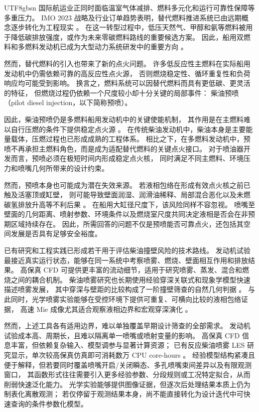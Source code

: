 \documentclass[english, 12pt, a4paper, elec, utf8, a-2b, online]{aaltothesis}
\begin{document}
\begin{CJK*}{UTF8}{gbsn}
国际航运业正同时面临温室气体减排、燃料多元化和运行可靠性保障等多重压力。
IMO 2023 战略及行业订单趋势表明，替代燃料推进系统已由远期概念逐步转化为工程现实
\cite{imo2023ghgstrategy,classnk2025alternativefuels}。
在这一转型过程中，低压天然气、甲醇和氨等燃料被用于降低碳排放强度，或作为未来零碳燃料路线的重要候选方案。
因此，船用双燃料和多燃料发动机已成为大型动力系统研发中的重要方向
\cite{wingd_lng_faq_2025,wingd_ammonia_faq_2025,classnk_methanol_2024}。

然而，替代燃料的引入也带来了新的点火问题。
许多低反应性主燃料在实际船用发动机中仍需依赖可靠的高反应性点火源，
否则燃烧稳定性、循环重复性和负荷响应均可能受到影响。
换言之，燃料系统可以因替代燃料而具有更低碳、更灵活的特征，
但燃烧过程仍依赖一个尺度较小却十分关键的局部事件：
柴油预喷（pilot diesel injection，以下简称预喷）。

因此，柴油预喷仍是多燃料船用发动机中的关键使能机制，
其作用是在主燃料难以自行压燃的条件下提供稳定点火源
\cite{wingd_xdf_manual_2021,classnk_methanol_2024}。
在传统柴油发动机中，柴油本身是主要能量载体，压燃过程也已形成成熟的工程体系。
相比之下，在多燃料发动机中，预喷不再承担主燃料角色，而是成为适配替代燃料的关键点火接口。
对于喷油器开发而言，预喷必须在极短时间内形成稳定点火核，
同时满足不同主燃料、环境压力和喷嘴几何所带来的设计约束。

然而，预喷本身也可能成为潜在失效来源。
若液相包络在形成有效点火核之前已触及活塞顶或缸壁，
则可能导致壁面润湿、润滑油稀释、局部混合恶化以及未燃碳氢排放升高等不利后果
\cite{peraza2022swi,ahmad2025fueldilution,MorieiraMotaPanao2010}。
在船用大缸径尺度下，该风险同样不容忽视。
喷嘴至壁面的几何距离、喷射参数、环境条件以及燃烧室尺度共同决定液相是否会在非预期区域持续存在。
因此，所需回答的问题不仅是预喷能否可靠点火，还包括其空间发展是否具有足够安全裕度。

已有研究和工程实践已形成若干用于评估柴油撞壁风险的技术路线。
发动机试验最接近真实运行状态，能够在同一系统中考察喷雾、燃烧、壁面相互作用和排放结果。
高保真 CFD 可提供更丰富的流动细节，适用于研究喷雾、蒸发、混合和燃烧之间的耦合机制。
柴油喷雾研究也长期使用经验穿深关联式和现象学模型快速描述喷雾发展，
其中穿深与壁距的比较构成了一阶撞壁筛查的自然几何判据
\cite{HiroyasuArai1990,NaberSiebers1996,Baumgarten2006MixFormation}。
与此同时，光学喷雾实验能够在受控环境下提供可重复、可横向比较的液相包络证据，
高速 Mie 成像尤其适合观察液相边界和宏观穿深演化 \cite{Linne2013SprayImaging}。

然而，上述工具各有适用边界，难以单独覆盖早期设计筛查的全部需求。
发动机试验成本高、周期长，且难以隔离单一喷嘴或喷射变量的影响。
高保真 CFD 信息丰富，但依赖复杂输入、模型调参与显著计算资源；
已有反应柴油喷雾 LES 研究显示，单次较高保真仿真即可消耗数万
CPU core-hours \cite{CurtisNiemeyerSung2017,liu2020sprayreview}。
经验模型结构紧凑且便于解释，但若要同时覆盖喷嘴开启/关闭瞬态、多孔喷嘴束间差异以及有限观测窗口，
其函数形式往往需要引入更多经验参数、分段规则或工况特定拟合，从而削弱快速泛化能力。
光学实验能够提供图像证据，但逐次后处理结果本质上仍为制表化离散观测；
若仅停留于观测结果本身，尚不能直接转化为设计迭代中可快速查询的条件参数化模型。


\end{CJK*}
\end{document}
